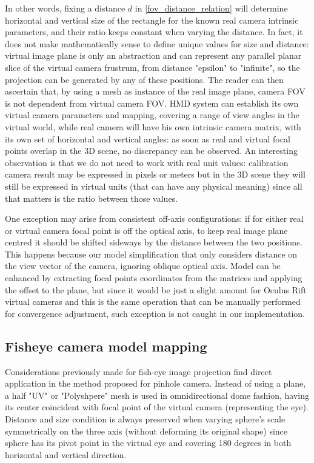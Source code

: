 In other words, fixing a distance $d$ in \ref{fov_distance_relation} will determine horizontal and vertical size of the rectangle for the known real camera intrinsic parameters, and their ratio keeps constant when varying the distance. In fact, it does not make mathematically sense to define unique values for size and distance: virtual image plane is only an abstraction and can represent any parallel planar slice of the virtual camera frustrum, from distance "epsilon" to "infinite", so the projection can be generated by any of these positions. The reader can then ascertain that, by using a mesh as instance of the real image plane, camera FOV is not dependent from virtual camera FOV. HMD system can establish its own virtual camera parameters and mapping, covering a range of view angles in the virtual world, while real camera will have his own intrinsic camera matrix, with its own set of horizontal and vertical angles: as soon as real and virtual focal points overlap in the 3D scene, no discrepancy can be observed. An interesting observation is that we do not need to work with real unit values: calibration camera result may be expressed in pixels or meters but in the 3D scene they will still be expressed in virtual units (that can have any physical meaning) since all that matters is the ratio between those values.

One exception may arise from consistent off-axis configurations: if for either real or virtual camera focal point is off the optical axis, to keep real image plane centred it should be shifted sideways by the distance between the two positions. This happens because our model simplification that only considers distance on the view vector of the camera, ignoring oblique optical axis. Model can be enhanced by extracting focal points coordinates from the matrices and applying the offset to the plane, but since it would be just a slight amount for Oculus Rift virtual cameras and this is the same operation that can be manually performed for convergence adjustment, such exception is not caught in our implementation.

\subsection{Fisheye camera model mapping}
Considerations previously made for fish-eye image projection find direct application in the method proposed for pinhole camera. Instead of using a plane, a half "UV" or "Polyshpere" mesh is used in omnidirectional dome fashion, having its center coincident with focal point of the virtual camera (representing the eye). Distance and size condition is always preserved when varying sphere's scale symmetrically on the three axis (without deforming its original shape) since sphere has its pivot point in the virtual eye and covering 180 degrees in both horizontal and vertical direction.

